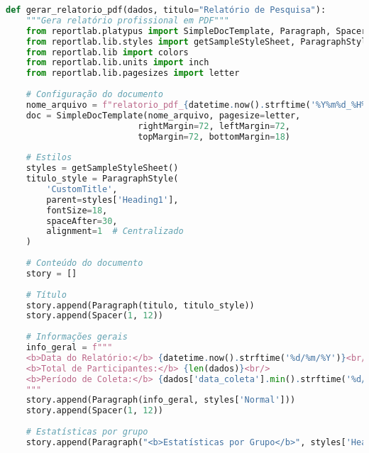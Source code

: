 \begin{pythonbox}
\begin{lstlisting}[language=Python]
def gerar_relatorio_pdf(dados, titulo="Relatório de Pesquisa"):
    """Gera relatório profissional em PDF"""
    from reportlab.platypus import SimpleDocTemplate, Paragraph, Spacer, Table, TableStyle, Image
    from reportlab.lib.styles import getSampleStyleSheet, ParagraphStyle
    from reportlab.lib import colors
    from reportlab.lib.units import inch
    from reportlab.lib.pagesizes import letter
    
    # Configuração do documento
    nome_arquivo = f"relatorio_pdf_{datetime.now().strftime('%Y%m%d_%H%M%S')}.pdf"
    doc = SimpleDocTemplate(nome_arquivo, pagesize=letter,
                          rightMargin=72, leftMargin=72,
                          topMargin=72, bottomMargin=18)
    
    # Estilos
    styles = getSampleStyleSheet()
    titulo_style = ParagraphStyle(
        'CustomTitle',
        parent=styles['Heading1'],
        fontSize=18,
        spaceAfter=30,
        alignment=1  # Centralizado
    )
    
    # Conteúdo do documento
    story = []
    
    # Título
    story.append(Paragraph(titulo, titulo_style))
    story.append(Spacer(1, 12))
    
    # Informações gerais
    info_geral = f"""
    <b>Data do Relatório:</b> {datetime.now().strftime('%d/%m/%Y')}<br/>
    <b>Total de Participantes:</b> {len(dados)}<br/>
    <b>Período de Coleta:</b> {dados['data_coleta'].min().strftime('%d/%m/%Y')} a {dados['data_coleta'].max().strftime('%d/%m/%Y')}
    """
    story.append(Paragraph(info_geral, styles['Normal']))
    story.append(Spacer(1, 12))
    
    # Estatísticas por grupo
    story.append(Paragraph("<b>Estatísticas por Grupo</b>", styles['Heading2']))
       \end{lstlisting}
\end{pythonbox}

